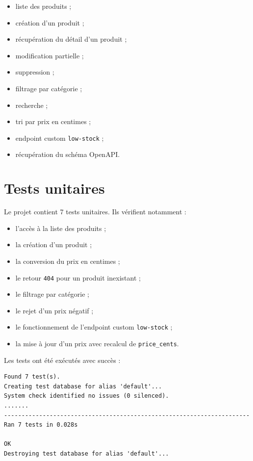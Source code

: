\documentclass[12pt,a4paper]{article}
\begin{document}
\begin{itemize}
    \item liste des produits ;
    \item création d'un produit ;
    \item récupération du détail d'un produit ;
    \item modification partielle ;
    \item suppression ;
    \item filtrage par catégorie ;
    \item recherche ;
    \item tri par prix en centimes ;
    \item endpoint custom \texttt{low-stock} ;
    \item récupération du schéma OpenAPI.
\end{itemize}

\section{Tests unitaires}

Le projet contient 7 tests unitaires. Ils vérifient notamment :

\begin{itemize}
    \item l'accès à la liste des produits ;
    \item la création d'un produit ;
    \item la conversion du prix en centimes ;
    \item le retour \texttt{404} pour un produit inexistant ;
    \item le filtrage par catégorie ;
    \item le rejet d'un prix négatif ;
    \item le fonctionnement de l'endpoint custom \texttt{low-stock} ;
    \item la mise à jour d'un prix avec recalcul de \texttt{price\_cents}.
\end{itemize}

Les tests ont été exécutés avec succès :

\begin{lstlisting}
Found 7 test(s).
Creating test database for alias 'default'...
System check identified no issues (0 silenced).
.......
----------------------------------------------------------------------
Ran 7 tests in 0.028s

OK
Destroying test database for alias 'default'...
\end{lstlisting}
\end{document}
